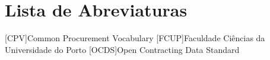 \chapter*{Lista de Abreviaturas}
\label{chap:abbreviations}

\begin{multicols}{2}[]
	\begin{scriptsize}
        	\begin{acronym}
        		    [CPV]{Common Procurement Vocabulary}
        		    {Faculdade Ciências da Universidade do Porto}
                    [OCDS]{Open Contracting Data Standard}
                    		\end{acronym}
	\end{scriptsize}
\end{multicols}
\clearemptydoublepage
